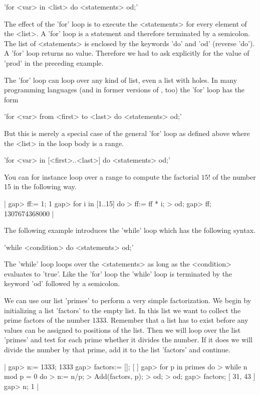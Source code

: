'for <var> in <list> do <statements> od;'

The  effect of the 'for'  loop  is to execute the <statements> for  every
element  of  the <list>.   A 'for'  loop  is  a  statement  and therefore
terminated by a semicolon.  The list of <statements>  is enclosed by  the
keywords 'do' and 'od'  (reverse  'do').  A 'for'  loop returns no value.
Therefore we had  to  ask  explicitly for  the  value  of  'prod' in  the
preceding example.

The 'for'  loop  can loop over any kind of  list, even a list with holes.
In many  programming languages (and  in  former versions  of {\GAP}, too)
the 'for' loop has the form

'for <var> from <first> to <last> do <statements> od;'

But this is merely a special  case of  the general  'for' loop as defined
above where the <list> in the loop body is a range.

'for <var> in [<first>..<last>] do <statements> od;'

You can for instance loop over a range to  compute the factorial $15!$ of
the number 15 in the following way.

|    gap> ff:= 1;
    1
    gap> for i in [1..15] do
    >       ff:= ff * i;
    >    od;
    gap> ff;
    1307674368000 |

The following example introduces the 'while' loop which has the following
syntax.

'while <condition> do <statements> od;'

The 'while' loop loops over the <statements>  as  long as the <condition>
evaluates to 'true'.  Like the 'for' loop the  'while' loop is terminated
by the keyword 'od' followed by a semicolon.

We can use  our list 'primes' to perform a very simple factorization.  We
begin by  initializing a list 'factors' to the empty list.   In this list
we want to collect the prime factors of the number 1333.  Remember that a
list has to exist  before any values  can be assigned to positions of the
list.  Then we  will loop over the list 'primes' and  test for each prime
whether it divides the  number.  If it does we will  divide the number by
that prime, add it to the list 'factors' and continue.

|    gap> n:= 1333;
    1333
    gap> factors:= [];
    [  ]
    gap> for p in primes do
    >       while n mod p = 0 do
    >          n:= n/p;
    >          Add(factors, p);
    >       od;
    >    od;
    gap> factors;
    [ 31, 43 ]
    gap> n;
    1 |

